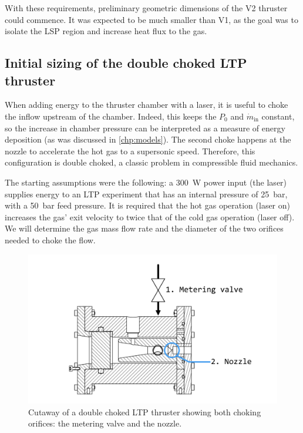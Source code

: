             With these requirements, preliminary geometric dimensions of the V2 thruster could commence. It was expected to be much smaller than V1, as the goal was to isolate the LSP region and increase heat flux to the gas.

        \subsection{Initial sizing of the double choked LTP thruster}

            When adding energy to the thruster chamber with a laser, it is useful to choke the inflow upstream of the chamber. Indeed, this keeps the $P_0$ and $\dot{m}_\mathrm{in}$ constant, so the increase in chamber pressure can be interpreted as a measure of energy deposition (as was discussed in \autoref{chp:models}). The second choke happens at the nozzle to accelerate the hot gas to a supersonic speed. Therefore, this configuration is double choked, a classic problem in compressible fluid mechanics.
            
            The starting assumptions were the following: a \qty{300}{W} power input (the laser) supplies energy to an LTP experiment that has an internal pressure of \qty{25}{bar}, with a \qty{50}{bar} feed pressure. It is required that the hot gas operation (laser on) increases the gas' exit velocity to twice that of the cold gas operation (laser off). We will determine the gas mass flow rate and the diameter of the two orifices needed to choke the flow.

            \begin{figure}[h]
                \centering
                \includegraphics[width=0.8\linewidth]{assets/3 design/Double choked LTP thruster.pdf}
                \caption{Cutaway of a double choked LTP thruster showing both choking orifices: the metering valve and the nozzle.}
                \label{fig:double choke sizing}
            \end{figure}
            
